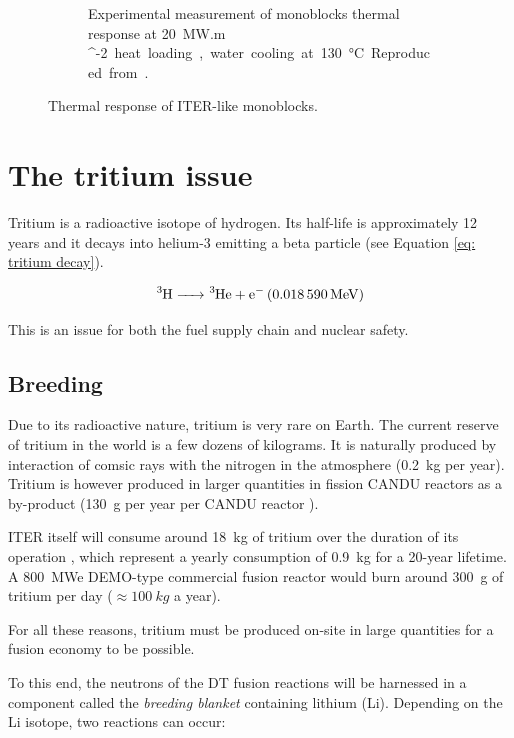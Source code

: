 \begin{figure} [h]
\begin{subfigure}[t]{0.45\linewidth}
            \caption{Experimental measurement of monoblocks thermal response at \SI{20}{MW.m ^{-2}} heat loading, water cooling at \SI{130}{\celsius}. Reproduced from \cite{visca_manufacturing_2018}.}
    \end{subfigure}
    \caption{Thermal response of ITER-like monoblocks.}
\end{figure}

\section{The tritium issue} \label{the tritium issue}

Tritium is a radioactive isotope of hydrogen.
Its half-life is approximately 12 years and it decays into helium-3 emitting a beta particle (see Equation \ref{eq: tritium decay}).

\begin{equation}
    \ce{^3H -> ^3He + e^- (\SI{0.018590}{MeV})}
    \label{eq: tritium decay}
\end{equation}

This is an issue for both the fuel supply chain and nuclear safety.

\subsection{Breeding}
Due to its radioactive nature, tritium is very rare on Earth.
The current reserve of tritium in the world is a few dozens of kilograms.
It is naturally produced by interaction of comsic rays with the nitrogen in the atmosphere (\SI{0.2}{kg} per year).
Tritium is however produced in larger quantities in fission CANDU reactors as a by-product (\SI{130}{g} per year per CANDU reactor ).

ITER itself will consume around \SI{18}{kg} of tritium over the duration of its operation , which represent a yearly consumption of \SI{0.9}{kg} for a 20-year lifetime.
A \SI{800}{MWe} DEMO-type commercial fusion reactor would burn around \SI{300}{g} of tritium per day ($\approx \SI{100}{kg}$ a year).

For all these reasons, tritium must be produced on-site in large quantities for a fusion economy to be possible.

To this end, the neutrons of the DT fusion reactions will be harnessed in a component called the \textit{breeding blanket} containing lithium (Li).
Depending on the Li isotope, two reactions can occur:

